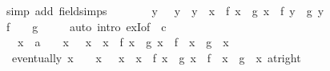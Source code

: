 \begin{isabellebody}
\ {\isacharparenleft}{\kern0pt}simp\ add{\isacharcolon}{\kern0pt}\ field{\isacharunderscore}{\kern0pt}simps{\isacharparenright}{\kern0pt}\isanewline
\ \ \ \ \isamarkupfalse%
\ \isamarkupfalse%
\ {\isachardoublequoteopen}{\isasymexists}y{\isachardot}{\kern0pt}\ {}\ {\isacharless}{\kern0pt}\ y\ {\isasymand}\ y\ {\isacharless}{\kern0pt}\ x\ {\isasymand}\ f\ x\ {\isacharslash}{\kern0pt}\ g\ x\ {\isacharequal}{\kern0pt}\ f{\isacharprime}{\kern0pt}\ y\ {\isacharslash}{\kern0pt}\ g{\isacharprime}{\kern0pt}\ y{\isachardoublequoteclose}\isanewline
\ \ \ \ \ \ \isamarkupfalse%
\ {\isacartoucheopen}f\ {}\ {\isacharequal}{\kern0pt}\ {}{\isacartoucheclose}\ {\isacartoucheopen}g\ {}\ {\isacharequal}{\kern0pt}\ {}{\isacartoucheclose}\ \isamarkupfalse%
\ {\isacharparenleft}{\kern0pt}auto\ intro{\isacharbang}{\kern0pt}{\isacharcolon}{\kern0pt}\ exI{\isacharbrackleft}{\kern0pt}of\ {\isacharunderscore}{\kern0pt}\ c{\isacharbrackright}{\kern0pt}{\isacharparenright}{\kern0pt}\isanewline
\ \ \isamarkupfalse%
\isanewline
\ \ \isamarkupfalse%
\ \isamarkupfalse%
\ {\isasymzeta}\ \ {\isachardoublequoteopen}{\isasymforall}x{\isasymin}{\isacharbraceleft}{\kern0pt}{}\ {\isacharless}{\kern0pt}{\isachardot}{\kern0pt}{\isachardot}{\kern0pt}{\isacharless}{\kern0pt}\ a{\isacharbraceright}{\kern0pt}{\isachardot}{\kern0pt}\ {}\ {\isacharless}{\kern0pt}\ {\isasymzeta}\ x\ {\isasymand}\ {\isasymzeta}\ x\ {\isacharless}{\kern0pt}\ x\ {\isasymand}\ f\ x\ {\isacharslash}{\kern0pt}\ g\ x\ {\isacharequal}{\kern0pt}\ f{\isacharprime}{\kern0pt}\ {\isacharparenleft}{\kern0pt}{\isasymzeta}\ x{\isacharparenright}{\kern0pt}\ {\isacharslash}{\kern0pt}\ g{\isacharprime}{\kern0pt}\ {\isacharparenleft}{\kern0pt}{\isasymzeta}\ x{\isacharparenright}{\kern0pt}{\isachardoublequoteclose}\ \isacommand{{\isachardot}{\kern0pt}{\isachardot}{\kern0pt}}\isamarkupfalse%
\isanewline
\ \ \isamarkupfalse%
\ \isamarkupfalse%
\ {\isasymzeta}{\isacharcolon}{\kern0pt}\ {\isachardoublequoteopen}eventually\ {\isacharparenleft}{\kern0pt}{\isasymlambda}x{\isachardot}{\kern0pt}\ {}\ {\isacharless}{\kern0pt}\ {\isasymzeta}\ x\ {\isasymand}\ {\isasymzeta}\ x\ {\isacharless}{\kern0pt}\ x\ {\isasymand}\ f\ x\ {\isacharslash}{\kern0pt}\ g\ x\ {\isacharequal}{\kern0pt}\ f{\isacharprime}{\kern0pt}\ {\isacharparenleft}{\kern0pt}{\isasymzeta}\ x{\isacharparenright}{\kern0pt}\ {\isacharslash}{\kern0pt}\ g{\isacharprime}{\kern0pt}\ {\isacharparenleft}{\kern0pt}{\isasymzeta}\ x{\isacharparenright}{\kern0pt}{\isacharparenright}{\kern0pt}\ {\isacharparenleft}{\kern0pt}at{\isacharunderscore}{\kern0pt}right\ {}{\isacharparenright}{\kern0pt}{\isachardoublequoteclose}\isanewline

\end{isabellebody}
